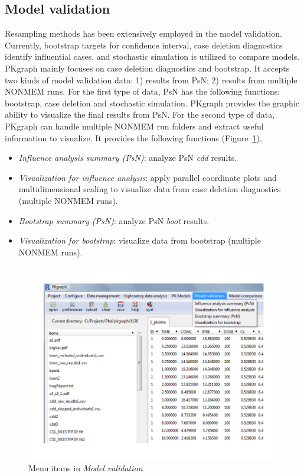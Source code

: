\documentclass[a4paper]{article}
\begin{document}
\subsection{Model validation}
Resampling methods has been extensively employed in the model validation. Currently, bootstrap targets for confidence interval, case deletion diagnostics identify influential cases, and stochastic simulation is utilized to compare models.
PKgraph mainly focuses on case deletion diagnostics and bootstrap. 
\newline
\newline
It accepts two kinds of model validation data: 1) results from PsN; 2) results from multiple NONMEM runs. For the first type of data, PsN has the following functions: bootstrap, case deletion and stochastic simulation. PKgraph provides the graphic ability to visualize the final results from PsN. For the second type of data, PKgraph can handle multiple NONMEM run folders and extract useful information to visualize. \newline
\newline
\newline
It provides the following functions (Figure~\ref{modelv}),
\begin{itemize}
	\item \textit{Influence analysis summary (PsN)}: analyze PsN \textit{cdd} results.
	\item \textit{Visualization for influence analysis}: apply parallel coordinate plots and multidimensional scaling to visualize data from case deletion diagnostics (multiple NONMEM runs).
	\item \textit{Bootstrap summary (PsN)}: analyze PsN \textit{boot} results.
	\item \textit{Visualization for bootstrap}: visualize data from bootstrap (multiple NONMEM runs).
\end{itemize}
\begin{figure}[h!tb] \centering
\includegraphics[scale=0.6]{modelv.pdf}
\caption{Menu items in \textit{Model validation}}
\label{modelv}
\end{figure}
\end{document}
